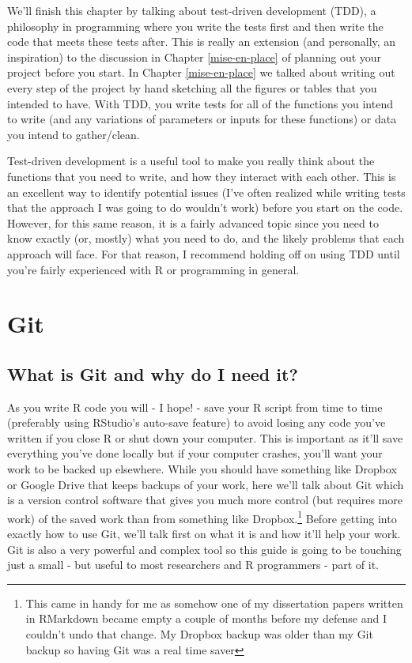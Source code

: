 \documentclass[
]{krantz}
\begin{document}
We'll finish this chapter by talking about test-driven development (TDD), a philosophy in programming where you write the tests first and then write the code that meets these tests after. This is really an extension (and personally, an inspiration) to the discussion in Chapter \ref{mise-en-place} of planning out your project before you start. In Chapter \ref{mise-en-place} we talked about writing out every step of the project by hand sketching all the figures or tables that you intended to have. With TDD, you write tests for all of the functions you intend to write (and any variations of parameters or inputs for these functions) or data you intend to gather/clean.

Test-driven development is a useful tool to make you really think about the functions that you need to write, and how they interact with each other. This is an excellent way to identify potential issues (I've often realized while writing tests that the approach I was going to do wouldn't work) before you start on the code. However, for this same reason, it is a fairly advanced topic since you need to know exactly (or, mostly) what you need to do, and the likely problems that each approach will face. For that reason, I recommend holding off on using TDD until you're fairly experienced with R or programming in general.

\hypertarget{git}{%
\chapter{Git}\label{git}}

\hypertarget{what-is-git-and-why-do-i-need-it}{%
\section{What is Git and why do I need it?}\label{what-is-git-and-why-do-i-need-it}}

As you write R code you will - I hope! - save your R script from time to time (preferably using RStudio's auto-save feature) to avoid losing any code you've written if you close R or shut down your computer. This is important as it'll save everything you've done locally but if your computer crashes, you'll want your work to be backed up elsewhere. While you should have something like Dropbox or Google Drive that keeps backups of your work, here we'll talk about Git which is a version control software that gives you much more control (but requires more work) of the saved work than from something like Dropbox.\footnote{This came in handy for me as somehow one of my dissertation papers written in RMarkdown became empty a couple of months before my defense and I couldn't undo that change. My Dropbox backup was older than my Git backup so having Git was a real time saver} Before getting into exactly how to use Git, we'll talk first on what it is and how it'll help your work. Git is also a very powerful and complex tool so this guide is going to be touching just a small - but useful to most researchers and R programmers - part of it.
\end{document}
